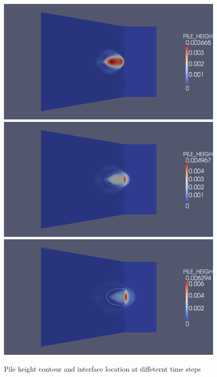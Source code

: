\documentclass[letterpaper,10pt]{article}
\begin{document}
\begin{figure}[H]
\begin{minipage}[b]{.5\linewidth}
  \end{minipage}
  \begin{minipage}[b]{.5\linewidth}
    \centering
    \includegraphics[width=1\textwidth]{IMAGES/phase_field/4.png}
    \includegraphics[width=1\textwidth]{IMAGES/phase_field/5.png}
    \includegraphics[width=1\textwidth]{IMAGES/phase_field/6.png}
  \end{minipage}
  \caption{Pile height contour and interface location at diffeternt time steps}
  \label{Phase_field1}
\end{figure}
\end{document}
